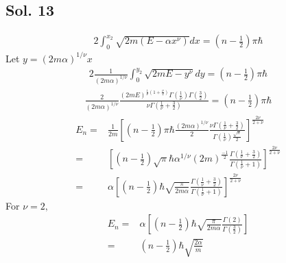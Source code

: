 \subsection*{Sol. 13}
\begin{align*}
    2\int_0^{x_2}
    \sqrt{2m(E-\alpha x^\nu)}dx
    =(n-\frac{1}{2})\pi\hbar
\end{align*}
Let $y=(2m\alpha)^{1/\nu} x$
\begin{align*}
    2\frac{1}{(2m\alpha)^{1/\nu}}\int_0^{y_2}
    \sqrt{2mE - y^\nu}dy
    =(n-\frac{1}{2})\pi\hbar
\end{align*}
\begin{align*}
    \frac{2}{(2m\alpha)^{1/\nu}}
    \frac{(2mE)^{\frac{1}{\nu}(1+\frac{\nu}{2})}
    \Gamma(\frac{1}{\nu})
    \Gamma(\frac{3}{2})
    }
    {\nu\Gamma(\frac{1}{\nu}+\frac{3}{2})}
    =(n-\frac{1}{2})\pi\hbar
\end{align*}
\begin{align*}
    E_n
    =&
    \frac{1}{2m}
    \left[(n-\frac{1}{2})\pi\hbar
    \frac{(2m\alpha)^{1/\nu}}{2}
    \frac
    {\nu\Gamma(\frac{1}{\nu}+\frac{3}{2})}
    {
    \Gamma(\frac{1}{\nu})
    \frac{\sqrt{\pi}}{2}
    }\right]^{\frac{2\nu}{2+\nu}}\\
    =&
    \left[(n-\frac{1}{2})\sqrt{\pi}\hbar
    \alpha^{1/\nu}
    (2m)^{\frac{-1}{2}}
    \frac
    {\Gamma(\frac{1}{\nu}+\frac{3}{2})}
    {
    \Gamma(\frac{1}{\nu}+1)
    }\right]^{\frac{2\nu}{2+\nu}}\\
    =&
    \alpha
    \left[(n-\frac{1}{2})
    \hbar
    \sqrt{\frac{\pi}{2m\alpha}}
    \frac
    {\Gamma(\frac{1}{\nu}+\frac{3}{2})}
    {
    \Gamma(\frac{1}{\nu}+1)
    }\right]^{\frac{2\nu}{2+\nu}}
\end{align*}
For $\nu=2,$
\begin{align*}
    E_n = &
    \alpha
    \left[(n-\frac{1}{2})
    \hbar
    \sqrt{\frac{\pi}{2m\alpha}}
    \frac
    {\Gamma(2)}
    {
    \Gamma(\frac{3}{2})
    }\right]\\
    =&
    (n-\frac{1}{2})
    \hbar
    \sqrt{\frac{2\alpha}{m}}
\end{align*}


